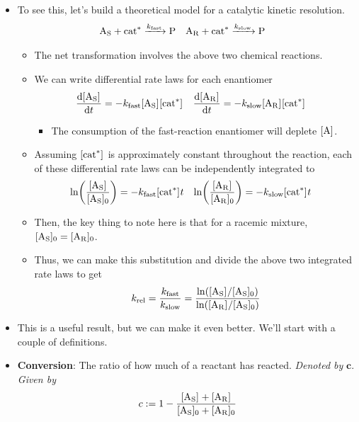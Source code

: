 \documentclass[../notes.tex]{subfiles}
\begin{document}
\begin{itemize}
    \item To see this, let's build a theoretical model for a catalytic kinetic resolution.
    \begin{align*}
        \ce{A_S + cat^*} &\ce{->[$\kf$] P}&
        \ce{A_R + cat^*} &\ce{->[$\ks$] P}
    \end{align*}
    \begin{itemize}
        \item The net transformation involves the above two chemical reactions.
        \item We can write differential rate laws for each enantiomer
        \begin{align*}
            \dv{\cnc{A_S}}{t} &= -\kf\cnc{A_S}\cnc{cat^*}&
            \dv{\cnc{A_R}}{t} &= -\ks\cnc{A_R}\cnc{cat^*}
        \end{align*}
        \begin{itemize}
            \item The consumption of the fast-reaction enantiomer will deplete $\cnc{A}$.
        \end{itemize}
        \item Assuming $\cnc{cat^*}$ is approximately constant throughout the reaction, each of these differential rate laws can be independently integrated to
        \begin{align*}
            \ln(\frac{\cnc{A_S}}{\cnc[0]{A_S}}) &= -\kf\cnc{cat^*}t&
            \ln(\frac{\cnc{A_R}}{\cnc[0]{A_R}}) &= -\ks\cnc{cat^*}t
        \end{align*}
        \item Then, the key thing to note here is that for a racemic mixture, $\cnc[0]{A_S}=\cnc[0]{A_R}$.
        \item Thus, we can make this substitution and divide the above two integrated rate laws to get
        \begin{equation*}
            \krel = \frac{\kf}{\ks}
            = \frac{\ln(\cnc{A_S}/\cnc[0]{A_S})}{\ln(\cnc{A_R}/\cnc[0]{A_S})}
        \end{equation*}
    \end{itemize}
    \item This is a useful result, but we can make it even better. We'll start with a couple of definitions.
    \item \textbf{Conversion}: The ratio of how much of a reactant has reacted. \emph{Denoted by} $\bm{c}$. \emph{Given by}
    \begin{equation*}
        c := 1-\frac{\cnc{A_S}+\cnc{A_R}}{\cnc[0]{A_S}+\cnc[0]{A_R}}

\end{equation*}
\end{itemize}
\end{document}
